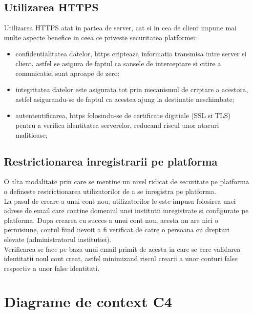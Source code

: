 \subsection*{Utilizarea HTTPS}

Utilizarea HTTPS atat in partea de server, cat si in cea de client impune mai multe aspecte benefice in ceea ce priveste securitatea platformei:

\begin{itemize}
	
	\item confidentialitatea datelor, https cripteaza informatia transmisa intre server si client, astfel se asigura de faptul ca sansele de interceptare si citire a  comunicatiei sunt aproape de zero;
	
	\item integritatea datelor este asigurata tot prin mecanismul de criptare a acestora, astfel asigurandu-se de faptul ca acestea ajung la destinatie neschimbate;
	
	\item autententificarea, https folosindu-se de certificate digitiale (SSL si TLS) pentru a verifica identitatea serverelor, reducand riscul unor atacuri malitioase; 
	
\end{itemize}


\subsection*{Restrictionarea inregistrarii pe platforma}

O alta modalitate prin care se mentine un nivel ridicat de securitate pe platforma o defineste restrictionarea utilizatorilor de a se inregistra pe platforma.\\
La pasul de creare a unui cont nou, utilizatorilor le este  impusa folosirea unei adrese de email care contine domeniul unei institutii inregistrate si configurate pe platforma. Dupa crearea cu succes a unui cont nou, acesta nu are nici o permisiune, contul fiind nevoit a fi verificat de catre o persoana cu drepturi elevate (administratorul institutiei).\\ 
Verificarea se face pe baza unui email primit de acesta in care se cere validarea identitatii noul cont creat, astfel minimizand riscul crearii a unor conturi false respectiv a unor false identitati.

\newpage
\section{Diagrame de context C4 }

